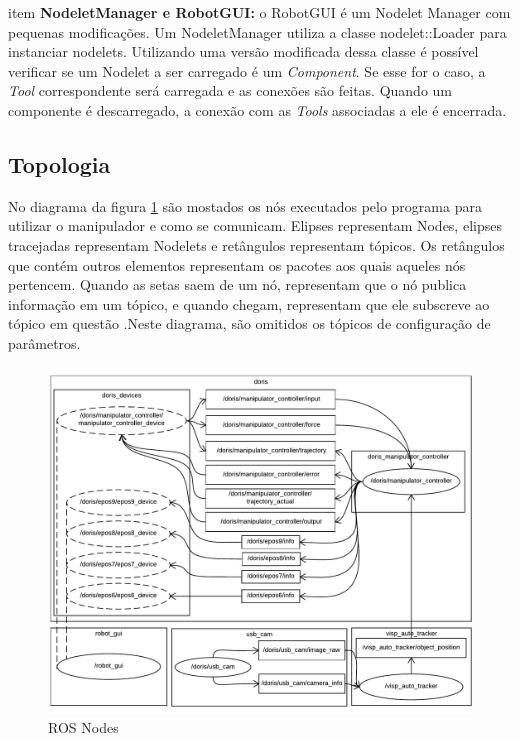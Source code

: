 \begin{itemize}
item \textbf{NodeletManager e RobotGUI:} o RobotGUI é um Nodelet Manager com pequenas modificações. Um NodeletManager utiliza a classe nodelet::Loader para instanciar nodelets. Utilizando uma versão modificada dessa classe é possível verificar se um Nodelet a ser carregado é um \textit{Component}. Se esse for o caso, a \textit{Tool} correspondente será carregada e as conexões são feitas. Quando um componente é descarregado, a conexão com as \textit{Tools} associadas a ele é encerrada.
\end{itemize}


\subsection{Topologia}

No diagrama da figura \ref{fig:ros_nodes} são mostados os nós executados pelo programa para utilizar o manipulador e como se comunicam. Elipses representam Nodes, elipses tracejadas representam Nodelets e retângulos representam tópicos. Os retângulos que contém outros elementos representam os pacotes aos quais aqueles nós pertencem. Quando as setas saem de um nó, representam que o nó publica informação em um tópico, e quando chegam, representam que ele subscreve ao tópico em questão .Neste diagrama, são omitidos os tópicos de configuração de parâmetros.

\begin{figure}[!h]
  \centering
  \includegraphics[width=\linewidth]{./img/node_diagram}
  \caption{ROS Nodes}
  \label{fig:ros_nodes}
\end{figure}

